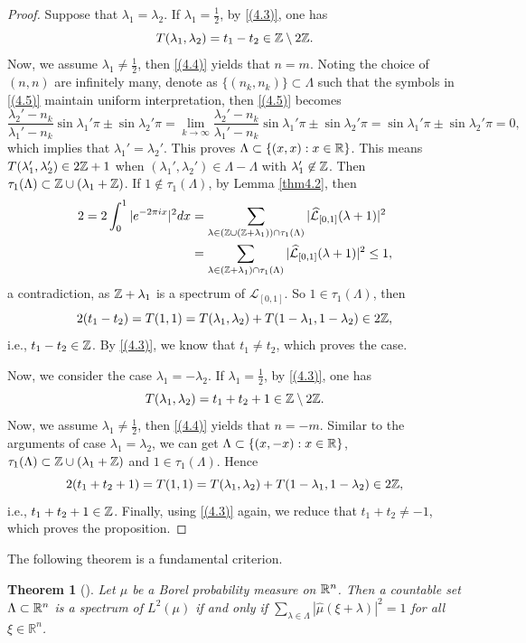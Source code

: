 \documentclass[12pt,psfig,reqno]{amsart}
\numberwithin{equation}{section}
\theoremstyle{plain}
\newtheorem{thm}{Theorem}[section]
\begin{document}
\begin{proof}
Suppose that $\lambda_1=\lambda_2$. 
If $\lambda_1=\frac12$, by \eqref{(4.3)}, one has 
$$
T(\lambda_1,\lambda_2)=t_1-t_2\in\Bbb Z\setminus2\Bbb Z.
$$
Now, we assume $\lambda_1\neq\frac12$, then \eqref{(4.4)} yields that $n=m$. 
Noting the choice of $(n,n)$ are infinitely many, denote as $\{(n_k,n_k)\}\subset\Lambda$ such that the symbols in \eqref{(4.5)} maintain uniform interpretation, then \eqref{(4.5)} becomes  
$$
\frac{\lambda_2'-n_k}{\lambda_1'-n_k}\sin\lambda_1'\pi\pm\sin\lambda_2'\pi=\lim_{k\rightarrow\infty}\frac{\lambda_2'-n_k}{\lambda_1'-n_k}\sin\lambda_1'\pi\pm\sin\lambda_2'\pi=\sin\lambda_1'\pi\pm\sin\lambda_2'\pi=0,
$$
which implies that $\lambda_1'=\lambda_2'$. 
This proves $\Lambda\subset\{(x,x):x\in\Bbb R\}$. 
This means $T(\lambda_1',\lambda_2')\in2\Bbb Z+1$ when $(\lambda_1',\lambda_2')\in\Lambda-\Lambda$ with $\lambda_1'\not\in\Bbb Z$. 
Then $\tau_1(\Lambda)\subset\Bbb Z\cup(\lambda_1+\Bbb Z)$. 
If $1\not\in\tau_1(\Lambda)$, by Lemma \ref{thm4.2}, then 
\begin{align*}
	2=	2\int_0^1|e^{-2\pi i x}|^2dx&=\sum_{\lambda\in(\Bbb Z\cup(\Bbb Z+\lambda_1))\cap\tau_1(\Lambda)}|\widehat{\mathcal{L}}_{[0,1]}(\lambda+1)|^2
	\\
	&=\sum_{\lambda\in(\Bbb Z+\lambda_1)\cap\tau_1(\Lambda)}|\widehat{\mathcal{L}}_{[0,1]}(\lambda+1)|^2\leq 1,
\end{align*}
a contradiction, as $\Bbb Z+\lambda_1$ is a spectrum of $\mathcal{L}_{[0,1]}$. 
So $1\in\tau_1(\Lambda)$, then 
$$
2(t_1-t_2)=T(1,1)=T(\lambda_1,\lambda_2)+T(1-\lambda_1,1-\lambda_2)\in2\Bbb Z,
$$
i.e., $t_1-t_2\in\Bbb Z$. 
By \eqref{(4.3)}, we know that $t_1\neq t_2$, which proves the case. 

Now, we consider the case $\lambda_1=-\lambda_2$. 
If $\lambda_1=\frac12$, by \eqref{(4.3)}, one has 
$$
T(\lambda_1,\lambda_2)=t_1+t_2+1
\in\Bbb Z\setminus2\Bbb Z.
$$
Now, we assume $\lambda_1\neq\frac12$, then \eqref{(4.4)} yields that $n=-m$. 
Similar to the arguments of case $\lambda_1=\lambda_2$, we can get $\Lambda\subset\{(x,-x):x\in\Bbb R\}$,  $\tau_1(\Lambda)\subset\Bbb Z\cup(\lambda_1+\Bbb Z)$ and  $1\in\tau_1(\Lambda)$. 
Hence
$$
2(t_1+t_2+1)=T(1,1)=T(\lambda_1,\lambda_2)+T(1-\lambda_1,1-\lambda_2)\in2\Bbb Z,
$$
i.e., $t_1+t_2+1\in\Bbb Z$. 
Finally, using \eqref{(4.3)} again, we reduce  that $t_1+t_2\neq-1$, which proves the proposition. 
\end{proof}
The following theorem is a fundamental criterion. 
\begin{thm}[\cite{JP98}]\label{thm4.6}
	Let $\mu$ be a Borel probability measure on $\Bbb R^n$. 
	Then a countable set $\Lambda\subset \Bbb R^n$ is a spectrum of $L^2 (\mu)$ if and only if $\sum_{\lambda\in\Lambda}|\widehat{\mu}(\xi+\lambda)|^2=1$ for all $\xi\in\mathbb{R}^n$.
\end{thm}
\end{document}
